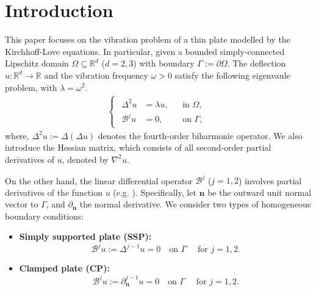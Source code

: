 \documentclass[final,reqno]{elsarticle}
\begin{document}
\section{Introduction}\label{SEC:Introduction}
This paper focuses on the vibration problem of a thin plate modelled by the Kirchhoff-Love equations. In particular, given a bounded simply-connected Lipschitz domain $\Omega\subseteq \mathbb{R}^d$ ($d=2,3$)  with boundary $\Gamma:=\partial \Omega$. The deflection $u:\mathbb{R}^d\rightarrow \mathbb{R}$ and the vibration frequency $\omega>0$ satisfy the following eigenvaule problem, with $\lambda = \omega^2$.
%
%
\begin{align}\label{MPr}
  \begin{cases}
    \begin{aligned}
      \Delta^2 u              &= \lambda u,     && \text{in } \Omega, \\
      \mathcal{B}^{j}u   &= 0,             && \text{on } \Gamma,
    \end{aligned}
  \end{cases}
\end{align}
where, $\Delta^2 u := \Delta(\Delta u)$ denotes the fourth-order biharmonic operator. We also introduce the Hessian matrix, which consists of all second-order partial derivatives of $u$, denoted by $\nabla^2u$. 

On the other hand, the linear differential operator $\mathcal{B}^{j}$ ($j=1,2$) involves partial derivatives of the function $u$ (e.g. \cite[Section~2.3]{gazzola}).
Specifically, let $\boldsymbol{n}$ be the outward unit normal vector to $\Gamma$,  and $\partial_{\boldsymbol{n}}$ the normal derivative. We consider two types of homogeneous boundary conditions:
\begin{itemize}
%
\item {\bf Simply supported plate (SSP):}   
\begin{equation}\label{SSP}
\mathcal{B}^{j}u:=\Delta^{j-1}u=0\quad \mbox{on }\Gamma \quad \mbox{ for }j=1,2.
\end{equation}      
%
\item {\bf Clamped plate (CP):}   
\begin{equation}\label{CP}
\mathcal{B}^{j}u:=\partial_{\boldsymbol{n}}^{j-1}u=0\quad \mbox{on }\Gamma \quad \mbox{ for }j=1,2.
\end{equation}      
\end{itemize}
\end{document}
